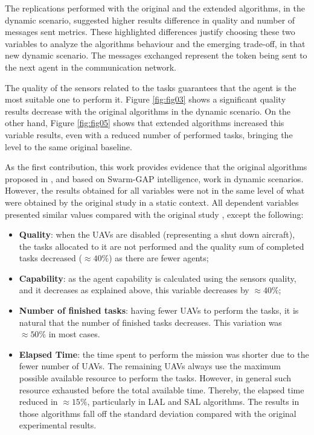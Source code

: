 The replications performed with the original and the extended algorithms, in the dynamic scenario, suggested higher results difference in quality and number of messages sent metrics. These highlighted differences justify choosing these two variables to analyze the algorithms behaviour and the emerging trade-off, in that new dynamic scenario. The messages exchanged represent the token being sent to the next agent in the communication network.

The quality of the sensors related to the tasks guarantees that the agent is the most suitable one to perform it. Figure \ref{fig:fig03} shows a significant quality results decrease with the original algorithms in the dynamic scenario. On the other hand, Figure \ref{fig:fig05} shows that extended algorithms increased this variable results, even with a reduced number of performed tasks, bringing the level to the same original baseline. 

As the first contribution, this work provides evidence that the original algorithms proposed in \cite{MAS07}, and based on Swarm-GAP intelligence, work in dynamic scenarios. However, the results obtained for all variables were not in the same level of what were obtained by the original study in a static context. All dependent variables presented similar values compared with the original study \cite{MAS07}, except the following:

\begin{itemize}
   \item \textbf{Quality}: when the UAVs are disabled (representing a shut down aircraft), the tasks allocated to it are not performed and the quality sum of completed tasks decreased ($\approx 40\%$) as there are fewer agents;
   \item \textbf{Capability}: as the agent capability is calculated using the sensors quality,  and it decreases as explained above, this variable decreases by $\approx 40\%$;
   \item \textbf{Number of finished tasks}: having fewer UAVs to perform the tasks, it is natural that the number of finished tasks decreases. This variation was $\approx 50\%$ in most cases.
   \item \textbf{Elapsed Time}: the time spent to perform the mission was shorter due to the fewer number of UAVs. The remaining UAVs always use the maximum possible available resource to perform the tasks. However, in general such resource exhausted before the total available time. Thereby, the elapsed time reduced in $\approx 15\%$, particularly in LAL and SAL algorithms. The results in those algorithms fall off the standard deviation compared with the original experimental results.
\end{itemize}

